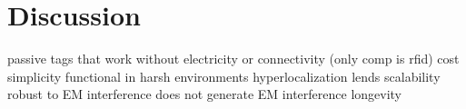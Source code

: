 \section{Discussion}
\label{sec:Discussion}

passive tags that work without electricity or connectivity (only comp is rfid)
cost
simplicity
functional in harsh environments
hyperlocalization lends scalability
robust to EM interference
does not generate EM interference
longevity



%
%
%



